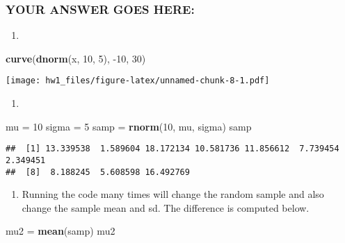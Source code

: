 \documentclass[
]{article}
\newenvironment{Shaded}{\begin{snugshade}}{\end{snugshade}}
\newcommand{\DecValTok}[1]{\textcolor[rgb]{0.00,0.00,0.81}{#1}}
\newcommand{\KeywordTok}[1]{\textcolor[rgb]{0.13,0.29,0.53}{\textbf{#1}}}
\newcommand{\NormalTok}[1]{#1}
\newcommand{\StringTok}[1]{\textcolor[rgb]{0.31,0.60,0.02}{#1}}
\providecommand{\tightlist}{%
  \setlength{\itemsep}{0pt}\setlength{\parskip}{0pt}}
\begin{document}
\hypertarget{your-answer-goes-here-1}{%
\subsubsection{YOUR ANSWER GOES HERE:}\label{your-answer-goes-here-1}}

\begin{enumerate}
\def\labelenumi{\arabic{enumi}.}
\tightlist
\item
\end{enumerate}

\begin{Shaded}
\begin{Highlighting}[]
\KeywordTok{curve}\NormalTok{(}\KeywordTok{dnorm}\NormalTok{(x, }\DecValTok{10}\NormalTok{, }\DecValTok{5}\NormalTok{), }\DecValTok{{-}10}\NormalTok{, }\DecValTok{30}\NormalTok{)}
\end{Highlighting}
\end{Shaded}

\texttt{[image: hw1\_files/figure-latex/unnamed-chunk-8-1.pdf]}

\begin{enumerate}
\def\labelenumi{\arabic{enumi}.}
\setcounter{enumi}{1}
\tightlist
\item
\end{enumerate}

\begin{Shaded}
\begin{Highlighting}[]
\NormalTok{mu =}\StringTok{ }\DecValTok{10}
\NormalTok{sigma =}\StringTok{ }\DecValTok{5}
\NormalTok{samp =}\StringTok{ }\KeywordTok{rnorm}\NormalTok{(}\DecValTok{10}\NormalTok{, mu, sigma)}
\NormalTok{samp}
\end{Highlighting}
\end{Shaded}

\begin{verbatim}
##  [1] 13.339538  1.589604 18.172134 10.581736 11.856612  7.739454  2.349451
##  [8]  8.188245  5.608598 16.492769
\end{verbatim}

\begin{enumerate}
\def\labelenumi{\arabic{enumi}.}
\setcounter{enumi}{2}
\tightlist
\item
  Running the code many times will change the random sample and also
  change the sample mean and sd. The difference is computed below.
\end{enumerate}

\begin{Shaded}
\begin{Highlighting}[]
\NormalTok{mu2 =}\StringTok{ }\KeywordTok{mean}\NormalTok{(samp)}
\NormalTok{mu2}
\end{Highlighting}
\end{Shaded}
\end{document}
